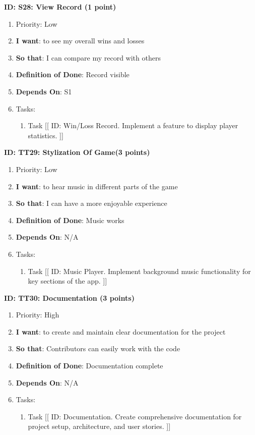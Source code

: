 \textbf{ID: S28: View Record (1 point)}
\begin{enumerate}
    \item Priority: Low
    \item \textbf{I want}: to see my overall wins and losses
    \item \textbf{So that}: I can compare my record with others
    \item \textbf{Definition of Done}: Record visible
    \item \textbf{Depends On}: S1
    \item Tasks:
    \begin{enumerate}
        \item Task [[ ID: Win/Loss Record. Implement a feature to display player statistics. ]]
    \end{enumerate}
\end{enumerate}

\textbf{ID: TT29: Stylization Of Game(3 points)}
\begin{enumerate}
    \item Priority: Low
    \item \textbf{I want}: to hear music in different parts of the game
    \item \textbf{So that}: I can have a more enjoyable experience
    \item \textbf{Definition of Done}: Music works
    \item \textbf{Depends On}: N/A
    \item Tasks:
    \begin{enumerate}
        \item Task [[ ID: Music Player. Implement background music functionality for key sections of the app. ]]
    \end{enumerate}
\end{enumerate}

\textbf{ID: TT30: Documentation (3 points)}
\begin{enumerate}
    \item Priority: High
    \item \textbf{I want}: to create and maintain clear documentation for the project
    \item \textbf{So that}: Contributors can easily work with the code
    \item \textbf{Definition of Done}: Documentation complete
    \item \textbf{Depends On}: N/A
    \item Tasks:
    \begin{enumerate}
        \item Task [[ ID: Documentation. Create comprehensive documentation for project setup, architecture, and user stories. ]]
    \end{enumerate}
\end{enumerate}
